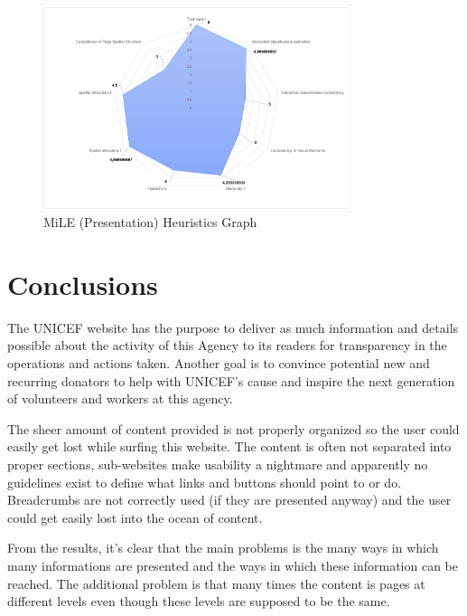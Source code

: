 \begin{figure}[h]
	\centering
	\includegraphics[width=0.8\textwidth]{img/mile_presentation.png}
	\caption{MiLE (Presentation) Heuristics Graph}
	\label{fig:mile_presentation_graph}
\end{figure}

\pagebreak

\section{Conclusions}
The UNICEF website has the purpose to deliver as much information and details possible about the activity of this Agency to its readers for transparency in the operations and actions taken. Another goal is to convince potential new and recurring donators to help with UNICEF's cause and inspire the next generation of volunteers and workers at this agency.

The sheer amount of content provided is not properly organized so the user could easily get lost while surfing this website. The content is often not separated into proper sections, sub-websites make usability a nightmare and apparently no guidelines exist to define what links and buttons should point to or do. Breadcrumbs are not correctly used (if they are presented anyway) and the user could get easily lost into the ocean of content.

From the results, it's clear that the main problems is the many ways in which many informations are presented and the ways in which these information can be reached. The additional problem is that many times the content is pages at different levels even though these levels are supposed to be the same.

